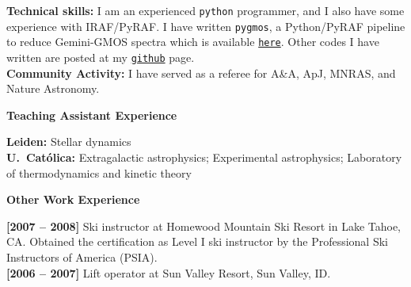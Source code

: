 \documentclass[11pt]{article}
\newcommand\technical[2]{
  \noindent
    {\large\bf #1:} #2\\
  }
\newcommand\sectitle[1]{
  \vspace{0.5cm}
  \noindent
  \textbf{\large #1}\\
  \vspace{-0.2cm}
}
\newcommand\itemdate[1]{\textbf{[#1]}}
\newcommand\itemdates[2]{\textbf{[#1 -- #2]}}
\begin{document}
\vspace{-0.5cm}
\technical{Technical skills}
{I am an experienced \texttt{python} programmer, and I also have some experience 
with IRAF/PyRAF. I have written {\tt pygmos}, a Python/PyRAF pipeline to reduce 
Gemini-GMOS spectra which is available 
\href{https://github.com/cristobal-sifon/pygmos/}{\texttt{here}}. Other codes I 
have written are posted at my 
\href{https://github.com/cristobal-sifon}{\texttt{github}} page.}


%

\technical{Community Activity}
{I have served as a referee for A\&A, ApJ, MNRAS, and Nature Astronomy.}


\pagebreak
\sectitle{Teaching Assistant Experience}

\noindent
\textbf{Leiden:} Stellar dynamics\\
\textbf{U.\ Cat\'olica:} Extragalactic astrophysics; Experimental astrophysics; Laboratory of thermodynamics and kinetic theory


\sectitle{Other Work Experience}

\noindent
\itemdates{2007}{2008} Ski instructor at Homewood Mountain Ski Resort in Lake Tahoe, CA. Obtained the certification as Level I ski instructor  by the Professional Ski Instructors of America (PSIA).\\
\itemdates{2006}{2007} Lift operator at Sun Valley Resort, Sun Valley, ID.

\vspace{1cm}
\hline
\vspace{1cm}
\end{document}
